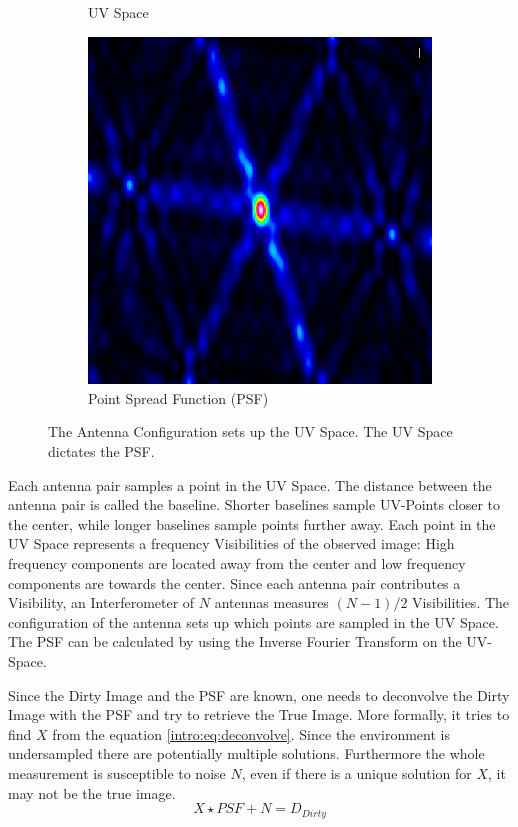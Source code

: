 \begin{figure}[h!]
\begin{subfigure}[b]{0.3\linewidth}
		\caption{UV Space}
	\end{subfigure}
	\begin{subfigure}[b]{0.3\linewidth}
	\includegraphics[width=\linewidth]{./chapters/01.intro/img/PSF.png}
	\caption{Point Spread Function (PSF)}
	\end{subfigure}
	\caption{The Antenna Configuration sets up the UV Space. The UV Space dictates the PSF.}
	\label{intro:ANT_UV_PSF}
\end{figure}

Each antenna pair samples a point in the UV Space. The distance between the antenna pair is called the baseline. Shorter baselines sample UV-Points closer to the center, while longer baselines sample points further away.  Each point in the UV Space represents a frequency Visibilities of the observed image: High frequency components are located away from the center and low frequency components are towards the center. Since each antenna pair contributes a Visibility, an Interferometer of $N$ antennas measures $(N-1)/2$ Visibilities. The configuration of the antenna sets up which points are sampled in the UV Space. The PSF can be calculated by using the Inverse Fourier Transform on the UV-Space.

Since the Dirty Image and the PSF are known, one needs to deconvolve the Dirty Image with the PSF and try to retrieve the True Image. More formally, it tries to find $X$ from the equation \eqref{intro:eq:deconvolve}. Since the environment is undersampled there are potentially multiple solutions. Furthermore the whole measurement is susceptible to noise $N$, even if there is a unique solution for $X$, it may not be the true image. 
\begin{equation}\label{intro:eq:deconvolve}
X \star PSF + N = D_{Dirty} 
\end{equation}

